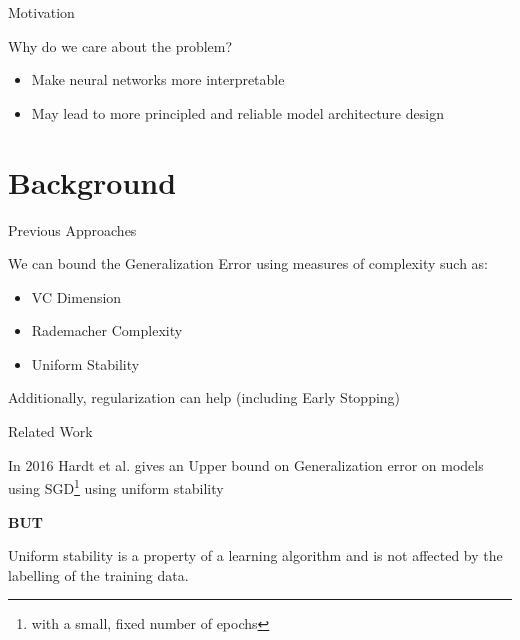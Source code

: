 \documentclass[10pt]{beamer}
\begin{document}

	

\begin{frame}{Motivation}
\begin{center}
	Why do we care about the problem?
\end{center}
\begin{itemize}
	\item Make neural networks more interpretable
	\item May lead to more principled and reliable model architecture design
\end{itemize}


\end{frame}	

\section{Background}

\begin{frame}{Previous Approaches}
	
We can bound the Generalization Error using measures of complexity such as:
\begin{itemize}
	\item VC Dimension 
	\item Rademacher Complexity
	\item Uniform Stability
\end{itemize}
Additionally, regularization can help (including Early Stopping)
\end{frame}	

\begin{frame}{Related Work}

In 2016 Hardt et al. gives an Upper bound on Generalization error on models using SGD\footnote{with a small, fixed number of epochs} using uniform stability \cite{DBLP:journals/corr/HardtRS15}

\textbf{BUT}

Uniform stability is a property of a learning algorithm and is not affected by the labelling of the training data.

\end{frame}
\end{document}
